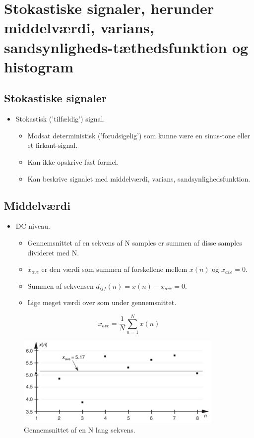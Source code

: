 \documentclass[danish]{article}
\begin{document}
\newpage
\section{Stokastiske signaler, herunder middelværdi, varians, sandsynligheds-tæthedsfunktion og histogram}

\subsection{Stokastiske signaler}
\begin{itemize}
	\item Stokastisk ('tilfældig') signal.
	\begin{itemize}
		\item Modsat deterministisk ('forudsigelig') som kunne være en sinus-tone eller et firkant-signal.
		\item Kan ikke opskrive fast formel.
		\item Kan beskrive signalet med middelværdi, varians, sandsynlighedsfunktion.
	\end{itemize}
\end{itemize}

\subsection{Middelværdi}
\begin{itemize}
	\item DC niveau.
	\begin{itemize}
		\item Gennemsnittet af en sekvens af N samples er summen af disse samples divideret med N.
		\item $x_{ave}$ er den værdi som summen af forskellene mellem $x(n)$ og $x_{ave} = 0$. 
		\item Summen af sekvensen $d_{iff}(n) = x(n) - x_{ave} = 0$. 
		\item Lige meget værdi over som under gennemsnittet.
	\end{itemize}
\end{itemize}

\begin{equation}
x_{ave} = \frac{1}{N} \sum_{n=1}^{N}x(n)
\end{equation}

\begin{figure} [H]
	\centering
	\includegraphics[width=0.6\linewidth]{graphics/x_ave}
	\caption{Gennemsnittet af en N lang sekvens. }
	\label{fig:x_ave}
\end{figure}
\end{document}
